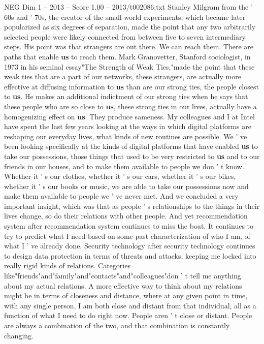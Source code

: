 \begin{textsample}{NEG Dim 1 – 2013 – Score 1.00 – 2013/t002086.txt}
Stanley Milgram from the ' 60s and ' 70s, the creator of the small-world experiments, which became later popularized as six degrees of separation, made the point that any two arbitrarily selected people were likely connected from between five to seven intermediary steps.
His point was that strangers are out there.
We can reach them.
There are paths that enable \textbf{us} to reach them.
Mark Granovetter, Stanford sociologist, in 1973 in his seminal essay"The Strength of Weak Ties,"made the point that these weak ties that are a part of our networks, these strangers, are actually more effective at diffusing information to \textbf{us} than are our strong ties, the people closest to \textbf{us}.
He makes an additional indictment of our strong ties when he says that these people who are so close to \textbf{us}, these strong ties in our lives, actually have a homogenizing effect on \textbf{us}.
They produce sameness.
My colleagues and I at Intel have spent the last few years looking at the ways in which digital platforms are reshaping our everyday lives, what kinds of new routines are possible.
We ' ve been looking specifically at the kinds of digital platforms that have enabled \textbf{us} to take our possessions, those things that used to be very restricted to \textbf{us} and to our friends in our houses, and to make them available to people we don ' t know.
Whether it ' s our clothes, whether it ' s our cars, whether it ' s our bikes, whether it ' s our books or music, we are able to take our possessions now and make them available to people we ' ve never met.
And we concluded a very important insight, which was that as people ' s relationships to the things in their lives change, so do their relations with other people.
And yet recommendation system after recommendation system continues to miss the boat.
It continues to try to predict what I need based on some past characterization of who I am, of what I ' ve already done.
Security technology after security technology continues to design data protection in terms of threats and attacks, keeping me locked into really rigid kinds of relations.
Categories like"friends"and"family"and"contacts"and"colleagues"don ' t tell me anything about my actual relations.
A more effective way to think about my relations might be in terms of closeness and distance, where at any given point in time, with any single person, I am both close and distant from that individual, all as a function of what I need to do right now.
People aren ' t close or distant.
People are always a combination of the two, and that combination is constantly changing.

\end{textsample}
